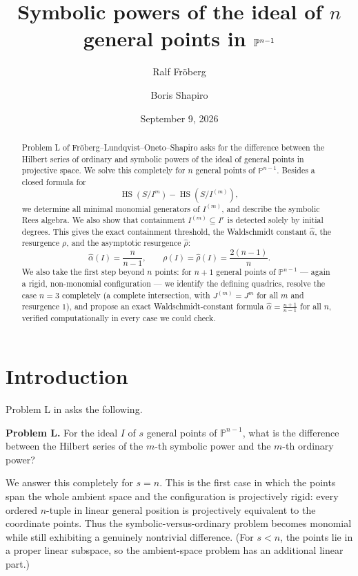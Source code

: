 \documentclass[11pt]{article}
\title{\bf Symbolic powers of the ideal of \(n\) general points in \(\PP^{n-1}\)}
\author{Ralf Fr\"oberg \and Boris Shapiro}
\date{September 9, 2026}
\newcommand{\PP}{\mathbb P}
\newcommand{\HS}{\operatorname{HS}}
\newcommand{\Res}{\rho}
\newcommand{\aRes}{\widehat{\rho}}
\newcommand{\walpha}{\widehat{\alpha}}
\begin{document}
\maketitle

\begin{abstract}
Problem L of Fr\"oberg--Lundqvist--Oneto--Shapiro asks for the
difference between the Hilbert series of ordinary and symbolic powers
of the ideal of general points in projective space.  We solve this
completely for \(n\) general points of \(\PP^{n-1}\).  Besides a closed
formula for
\[
  \HS(S/I^m)-\HS(S/I^{(m)}),
\]
we determine all minimal monomial generators of \(I^{(m)}\),  and describe the symbolic Rees algebra.
We also show that containment \(I^{(m)}\subseteq I^r\) is detected
solely by initial degrees.  This gives the exact containment threshold,
the Waldschmidt constant \(\walpha\), the resurgence \(\Res\), and the asymptotic
resurgence \(\aRes\):
\[
 \walpha(I)=\frac{n}{n-1},
 \qquad
 \Res(I)=\aRes(I)=\frac{2(n-1)}{n}.
\]
We also take the first step beyond \(n\) points: for \(n+1\) general
points of \(\PP^{n-1}\) --- again a rigid, non-monomial configuration
--- we identify the defining quadrics, resolve the case \(n=3\)
completely (a complete intersection, with \(J^{(m)}=J^m\) for all
\(m\) and resurgence \(1\)), and propose an exact Waldschmidt-constant
formula \(\walpha=\frac{n+1}{n-1}\) for all \(n\), verified
computationally in every case we could check.
\end{abstract}

\section{Introduction}

Problem L in \cite{FLOS18} asks the following.

\medskip
\noindent
\textbf{Problem L.}
For the ideal \(I\) of \(s\) general points of \(\PP^{n-1}\), what is
the difference between the Hilbert series of the \(m\)-th symbolic
power and the \(m\)-th ordinary power?

\medskip
We answer this completely for \(s=n\).  This is the first case in
which the points span the whole ambient space and the configuration is
projectively rigid: every ordered \(n\)-tuple in linear general
position is projectively equivalent to the coordinate points.  Thus
the symbolic-versus-ordinary problem becomes monomial while still
exhibiting a genuinely nontrivial difference.  (For \(s<n\), the
points lie in a proper linear subspace, so the ambient-space problem
has an additional linear part.)
\end{document}

